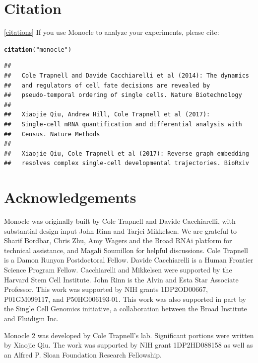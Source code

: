 \documentclass[10pt,oneside]{article}\usepackage[]{graphicx}\usepackage[]{color}
\makeatletter
\newcommand{\hlstr}[1]{\textcolor[rgb]{0.192,0.494,0.8}{#1}}%
\newcommand{\hlstd}[1]{\textcolor[rgb]{0.345,0.345,0.345}{#1}}%
\newcommand{\hlkwd}[1]{\textcolor[rgb]{0.737,0.353,0.396}{\textbf{#1}}}%
\newenvironment{kframe}{%
 \def\at@end@of@kframe{}%
 \ifinner\ifhmode%
  \def\at@end@of@kframe{\end{minipage}}%
  \begin{minipage}{\columnwidth}%
 \fi\fi%
 \def\FrameCommand##1{\hskip\@totalleftmargin \hskip-\fboxsep
 \colorbox{shadecolor}{##1}\hskip-\fboxsep
     \hskip-\linewidth \hskip-\@totalleftmargin \hskip\columnwidth}%
 \MakeFramed {\advance\hsize-\width
   \@totalleftmargin\z@ \linewidth\hsize
   \@setminipage}}%
 {\par\unskip\endMakeFramed%
 \at@end@of@kframe}
\newenvironment{knitrout}{}{} %
\makeatother
\begin{document}
 \section{Citation}\ref{citations}
 If you use Monocle to analyze your experiments, please cite:
\begin{knitrout}
\color{fgcolor}\begin{kframe}
\begin{alltt}
\hlkwd{citation}\hlstd{(}\hlstr{"monocle"}\hlstd{)}
\end{alltt}
\begin{verbatim}
## 
##   Cole Trapnell and Davide Cacchiarelli et al (2014): The dynamics
##   and regulators of cell fate decisions are revealed by
##   pseudo-temporal ordering of single cells. Nature Biotechnology
## 
##   Xiaojie Qiu, Andrew Hill, Cole Trapnell et al (2017):
##   Single-cell mRNA quantification and differential analysis with
##   Census. Nature Methods
## 
##   Xiaojie Qiu, Cole Trapnell et al (2017): Reverse graph embedding
##   resolves complex single-cell developmental trajectories. BioRxiv
\end{verbatim}
\end{kframe}
\end{knitrout}
 
 \section{Acknowledgements}
 
 Monocle was originally built by Cole Trapnell and Davide Cacchiarelli, with substantial design input John Rinn and Tarjei Mikkelsen. We are grateful to Sharif Bordbar, Chris Zhu, Amy Wagers and the Broad RNAi platform for technical assistance, and Magali Soumillon for helpful discussions. Cole Trapnell is a Damon Runyon Postdoctoral Fellow. Davide Cacchiarelli is a Human Frontier Science Program Fellow. Cacchiarelli and Mikkelsen were supported by the Harvard Stem Cell Institute. John Rinn is the Alvin and Esta Star Associate Professor. This work was supported by NIH grants 1DP2OD00667, P01GM099117, and P50HG006193-01. This work was also supported in part by the Single Cell Genomics initiative, a collaboration between the Broad Institute and Fluidigm Inc.
 
 Monocle 2 was developed by Cole Trapnell's lab. Significant portions were written by Xiaojie Qiu. The work was supported by NIH grant 1DP2HD088158 as well as an Alfred P. Sloan Foundation Research Fellowship.
 
\end{document}
